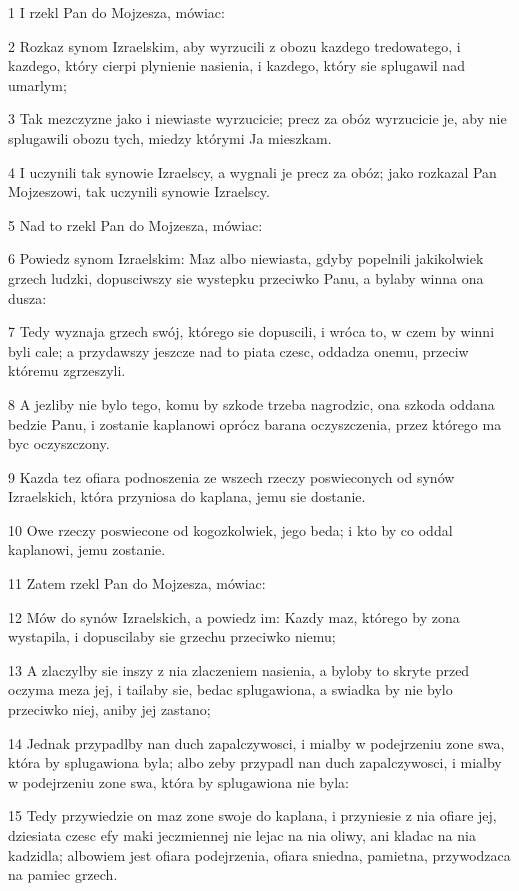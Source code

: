 \par 1 I rzekl Pan do Mojzesza, mówiac:
\par 2 Rozkaz synom Izraelskim, aby wyrzucili z obozu kazdego tredowatego, i kazdego, który cierpi plynienie nasienia, i kazdego, który sie splugawil nad umarlym;
\par 3 Tak mezczyzne jako i niewiaste wyrzucicie; precz za obóz wyrzucicie je, aby nie splugawili obozu tych, miedzy którymi Ja mieszkam.
\par 4 I uczynili tak synowie Izraelscy, a wygnali je precz za obóz; jako rozkazal Pan Mojzeszowi, tak uczynili synowie Izraelscy.
\par 5 Nad to rzekl Pan do Mojzesza, mówiac:
\par 6 Powiedz synom Izraelskim: Maz albo niewiasta, gdyby popelnili jakikolwiek grzech ludzki, dopusciwszy sie wystepku przeciwko Panu, a bylaby winna ona dusza:
\par 7 Tedy wyznaja grzech swój, którego sie dopuscili, i wróca to, w czem by winni byli cale; a przydawszy jeszcze nad to piata czesc, oddadza onemu, przeciw któremu zgrzeszyli.
\par 8 A jezliby nie bylo tego, komu by szkode trzeba nagrodzic, ona szkoda oddana bedzie Panu, i zostanie kaplanowi oprócz barana oczyszczenia, przez którego ma byc oczyszczony.
\par 9 Kazda tez ofiara podnoszenia ze wszech rzeczy poswieconych od synów Izraelskich, która przyniosa do kaplana, jemu sie dostanie.
\par 10 Owe rzeczy poswiecone od kogozkolwiek, jego beda; i kto by co oddal kaplanowi, jemu zostanie.
\par 11 Zatem rzekl Pan do Mojzesza, mówiac:
\par 12 Mów do synów Izraelskich, a powiedz im: Kazdy maz, którego by zona wystapila, i dopuscilaby sie grzechu przeciwko niemu;
\par 13 A zlaczylby sie inszy z nia zlaczeniem nasienia, a byloby to skryte przed oczyma meza jej, i tailaby sie, bedac splugawiona, a swiadka by nie bylo przeciwko niej, aniby jej zastano;
\par 14 Jednak przypadlby nan duch zapalczywosci, i mialby w podejrzeniu zone swa, która by splugawiona byla; albo zeby przypadl nan duch zapalczywosci, i mialby w podejrzeniu zone swa, która by splugawiona nie byla:
\par 15 Tedy przywiedzie on maz zone swoje do kaplana, i przyniesie z nia ofiare jej, dziesiata czesc efy maki jeczmiennej nie lejac na nia oliwy, ani kladac na nia kadzidla; albowiem jest ofiara podejrzenia, ofiara sniedna, pamietna, przywodzaca na pamiec grzech.
